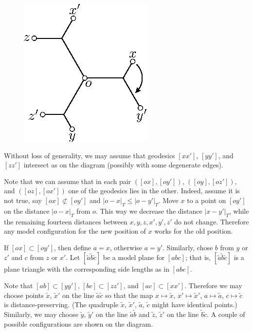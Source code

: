 \documentclass{article}
\begin{document}
\begin{figure}
\vskip-12mm
\centering
\includegraphics{mppics/pic-40}
\end{figure}

Without loss of generality, we may assume that geodesics $[xx']$, $[yy']$, and $[zz']$ intersect as on the diagram (possibly with some degenerate edges).

Note that we can assume that in each pair $([ox],[oy'])$, $([oy],[oz'])$, and $([oz],[ox'])$ one of the geodesics lies in the other.
Indeed, assume it is not true, say $[ox]\not\subset[oy']$ and $|o-x|_T\le |o-y'|_T$.
Move $x$ to a point on $[oy']$ on the distance $|o-x|_T$ from $o$.
This way we decrease the distance $|x-y'|_T$, while the remaining fourteen distances between $x,y,z,x',y',z'$ do not change.
Therefore any model configuration for the new position of $x$ works for the old position.

If $[ox]\subset [oy']$, then define $a=x$, otherwise $a=y'$.
Similarly, chose  $b$ from $y$ or $z'$ and $c$ from $z$ or $x'$.
Let $[\tilde a\tilde b\tilde c]$ be a model plane for $[abc]$;
that is, $[\tilde a\tilde b\tilde c]$ is a plane triangle with the corresponding side lengths as in $[abc]$.

Note that $[ab]\subset [yy']$, $[bc]\subset [zz']$, and $[ac]\subset [xx']$.
Therefore we may choose points $\tilde x$, $\tilde x'$ on the line $\tilde a\tilde c$ so that the map $x\mapsto \tilde x$, $x'\mapsto \tilde x'$, $a\mapsto \tilde a$, $c\mapsto \tilde c$ is distance-preserving.
(The quadruple $\tilde x$, $\tilde x'$, $\tilde a$, $\tilde c$ might have identical points.)
Similarly, we may choose $\tilde y$, $\tilde y'$ on the line $\tilde a\tilde b$ and $\tilde z$, $\tilde z'$ on the line $\tilde b\tilde c$.
A couple of possible configurations are shown on the diagram.
\end{document}
